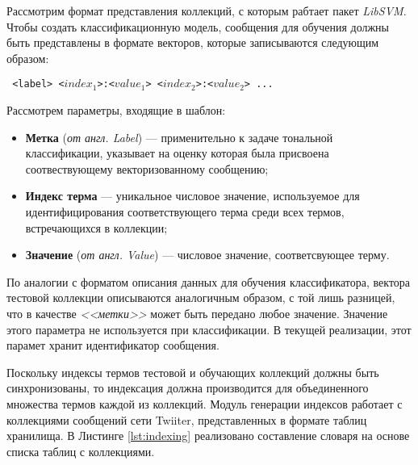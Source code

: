     Рассмотрим формат представления коллекций, с которым рабтает пакет {\it LibSVM}.
    Чтобы создать классификационную модель, сообщения для обучения должны быть
    представлены в формате векторов, которые записываются следующим образом:
    \begin{center}
        \tt
        <label> <$index_1$>:<$value_1$> <$index_2$>:<$value_2$> ...
    \end{center}

    Рассмотрем параметры, входящие в шаблон:
    \begin{itemize}
        \item {\bf Метка} ({\it от англ. Label}) --- применительно к задаче
        тональной классификации, указывает на оценку которая была присвоена
        соотвествующему векторизованному сообщению;
        \item {\bf Индекс терма} --- уникальное числовое значение, используемое
        для идентифицирования соответствующего терма среди всех термов, встречающихся
        в коллекции;
        \item {\bf Значение} ({\it от англ. Value}) --- числовое значение,
        соответсвующее терму.
    \end{itemize}

    По аналогии с форматом описания данных для обучения классификатора, вектора
    тестовой коллекции описываются аналогичным образом, с той лишь разницей, что
    в качестве {\it <<метки>>} может быть передано любое значение.
    Значение этого параметра не используется при классификации.
    В текущей реализации, этот парамет хранит идентификатор сообщения.

    Поскольку индексы термов тестовой и обучающих коллекций должны быть
    синхронизованы, то индексация должна производится для объединенного
    множества термов каждой из коллекций.
    Модуль генерации индексов работает с коллекциями сообщений сети Twiiter,
    представленных в формате таблиц хранилища. В Листинге \ref{lst:indexing}
    реализовано составление словаря на основе списка таблиц с коллекциями.

    \lstset{style=python}
    

